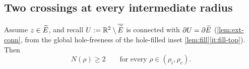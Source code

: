 \subsection{Two crossings at every intermediate radius}

\begin{lemma}\label{lem:Ncross}
Assume $z\in\widetilde{E}$, and recall $U:=\mathbb{R}^2\setminus\overline{\widetilde{E}}$ is connected
with $\partial U=\partial\widetilde{E}$ \textup{(}\cref{lem:ext-conn}, from the global
hole-freeness of the hole-filled inset \cref{lem:fill}\ref{it:fill-top}\textup{)}.
Then
\begin{equation}\label{eq:Ngeq2}
   N(\rho)\ge2\qquad\text{for every }\rho\in(\rho_i,\rho_e).
\end{equation}
\end{lemma}

